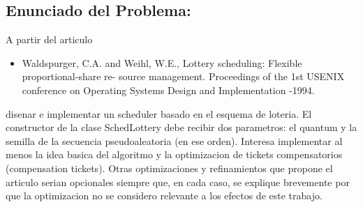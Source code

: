 \subsection{Enunciado del Problema:}

A partir del articulo
\begin{itemize}
	\item Waldspurger, C.A. and Weihl, W.E., Lottery scheduling: Flexible proportional-share re- source management. Proceedings of the 1st USENIX conference on Operating Systems Design and Implementation -1994.
\end{itemize}

disenar e implementar un scheduler basado en el esquema de loteria. El constructor de la clase SchedLottery debe recibir dos parametros: el quantum y la semilla de la secuencia pseudoaleatoria (en ese orden). Interesa implementar al menos la idea basica del algoritmo y la optimizacion de tickets compensatorios (compensation tickets). Otras optimizaciones y refinamientos que propone el articulo serian opcionales siempre que, en cada caso, se explique brevemente por que la optimizacion no se considero relevante a los efectos de este trabajo.